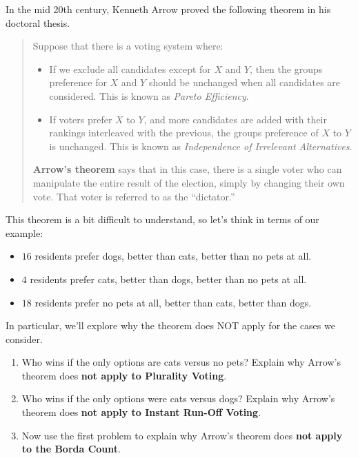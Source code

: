 \documentclass[nooutcomes,noauthor,hints,handout,12pt]{ximera}
\begin{document}
\begin{question}
  In the mid 20th century, Kenneth Arrow proved the following theorem in his doctoral thesis.
 \begin{mdframed}[style=OutcomeStyle]
  \begin{quote}
    Suppose that there is a voting system where:
    \begin{itemize}
    \item If we exclude all candidates except for $X$ and $Y$, then
      the groups preference for $X$ and $Y$ should be unchanged when
      all candidates are considered. This is known as \textit{Pareto
        Efficiency}.
    \item If voters prefer $X$ to $Y$, and more candidates are added
      with their rankings interleaved with the previous, the groups
      preference of $X$ to $Y$ is unchanged. This is known as
      \textit{Independence of Irrelevant Alternatives}.
    \end{itemize}
    \textbf{Arrow's theorem} says that in this case,
    there is a single voter who can manipulate the entire result of
    the election, simply by changing their own vote.  That voter is
    referred to as the ``dictator.''
  \end{quote}
 \end{mdframed}
This theorem is a bit difficult to understand, so let's think in terms
of our example:
\begin{itemize}
\item $16$ residents prefer dogs, better than cats, better than no pets at all.
\item $4$ residents prefer cats, better than dogs, better than no pets at all.
\item $18$ residents prefer no pets at all, better than cats, better
  than dogs.
\end{itemize}
In particular, we'll explore why the theorem does NOT apply for the cases we consider. 
\begin{enumerate}
  \item Who wins if the only options are cats versus no pets? Explain why Arrow's theorem does \textbf{not apply to Plurality Voting}.
\item Who wins if the only options were cats versus dogs? Explain why Arrow's theorem does \textbf{not apply to Instant Run-Off Voting}.
\item Now use the first problem to explain why Arrow's theorem does \textbf{not apply to the Borda Count}.
\end{enumerate}

\end{question}
\mynewpage
\end{document}
